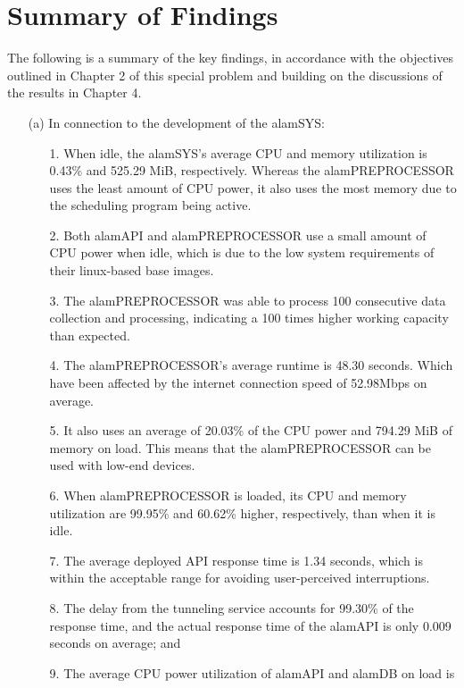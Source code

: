 \section{Summary of Findings}
\label{sec:sum_find}
The following is a summary of the key findings, in accordance with 
the objectives outlined in Chapter 2 of this special problem and 
building on the discussions of the results in Chapter 4.

\begin{itemize}
    \item[(a)] In connection to the development of the alamSYS:
        \begin{itemize}
            \item[1.] When idle, the alamSYS's average CPU and memory utilization 
            is 0.43\% and 525.29 MiB, respectively. Whereas the 
            alamPREPROCESSOR uses the least amount of CPU power, 
            it also uses the most memory due to the scheduling program being active.
            \item[2.] Both alamAPI and alamPREPROCESSOR use a small amount of CPU power when idle, 
            which is due to the low system requirements of their linux-based base images.
            \item[3.] The alamPREPROCESSOR was able to process 100 consecutive data collection 
            and processing, indicating a 100 times higher working capacity than expected.
            \item[4.] The alamPREPROCESSOR's average runtime is 48.30 seconds. Which have
            been affected by the internet connection speed of 52.98Mbps on average.
            \item[5.] It also uses an average of 20.03\% of the CPU power and 794.29 MiB of memory on load. 
            This means that the alamPREPROCESSOR can be used with low-end devices.
            \item[6.] When alamPREPROCESSOR is loaded, its CPU and memory utilization are 
            99.95\% and 60.62\% higher, respectively, than when it is idle.
            \item[7.] The average deployed API response time is 1.34 seconds, 
            which is within the acceptable range for avoiding user-perceived interruptions.
            \item[8.] The delay from the tunneling service accounts for 99.30\% of the response time, 
            and the actual response time of the alamAPI is only 0.009 seconds on average; and
            \item[9.] The average CPU power utilization of alamAPI and alamDB on load is 

\end{itemize}
\end{itemize}
